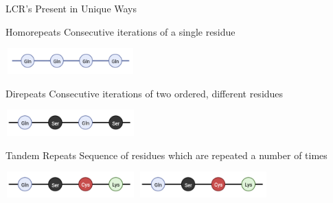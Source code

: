 \documentclass{beamer}
\begin{document}
	\begin{frame}{LCR's Present in Unique Ways }
		
		\begin{alertblock}{Homorepeats}
			Consecutive iterations of a single residue
		\end{alertblock}
	
		\begin{center}
			\includegraphics[width=5cm, height=1cm]{poyglut.png}
		\end{center} \pause
	
		\begin{alertblock}{Direpeats}
			Consecutive iterations of two ordered, different residues
		\end{alertblock}
	
		\begin{center}
			\includegraphics[width=5cm, height=1cm]{direpeat.png}
		\end{center} \pause

		\begin{alertblock}{Tandem Repeats}
			Sequence of residues which are repeated a number of times
		\end{alertblock}
	
		\begin{center}
			\includegraphics[width=5cm, height=1cm]{tandem.png}
			\includegraphics[width=5cm, height=1cm]{tandem.png}
		\end{center}
	
	\end{frame}
\end{document}
